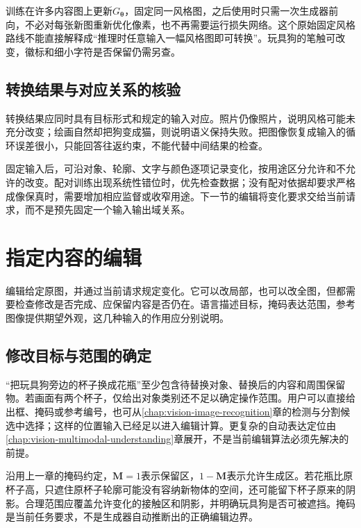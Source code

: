训练在许多内容图上更新$G_{\bm{\theta}}$，固定同一风格图，之后使用时只需一次生成器前向，不必对每张新图重新优化像素，也不再需要运行损失网络。这个原始固定风格路线不能直接解释成“推理时任意输入一幅风格图即可转换”。玩具狗的笔触可改变，徽标和细小字符是否保留仍需另查。

\subsection{转换结果与对应关系的核验}
\label{sec:vision-generation-translation-check}

转换结果应同时具有目标形式和规定的输入对应。照片仍像照片，说明风格可能未充分改变；绘画自然却把狗变成猫，则说明语义保持失败。把图像恢复成输入的循环误差很小，只能回答往返约束，不能代替中间结果的检查。

固定输入后，可沿对象、轮廓、文字与颜色逐项记录变化，按用途区分允许和不允许的改变。配对训练出现系统性错位时，优先检查数据；没有配对依据却要求严格成像保真时，需要增加相应监督或收窄用途。下一节的编辑将变化要求交给当前请求，而不是预先固定一个输入输出域关系。

\section{指定内容的编辑}
\label{sec:vision-generation-editing}

编辑给定原图，并通过当前请求规定变化。它可以改局部，也可以改全图，但都需要检查修改是否完成、应保留内容是否仍在。语言描述目标，掩码表达范围，参考图像提供期望外观，这几种输入的作用应分别说明。

\subsection{修改目标与范围的确定}
\label{sec:vision-generation-editing-scope}

“把玩具狗旁边的杯子换成花瓶”至少包含待替换对象、替换后的内容和周围保留物。若画面有两个杯子，仅给出对象类别还不足以确定操作范围。用户可以直接给出框、掩码或参考编号，也可从\ref{chap:vision-image-recognition}章的检测与分割候选中选择；这样的位置输入已经足以进入编辑计算。更复杂的自动表达定位由\ref{chap:vision-multimodal-understanding}章展开，不是当前编辑算法必须先解决的前提。

沿用上一章的掩码约定，$\bm{M}=1$表示保留区，$1-\bm{M}$表示允许生成区。若花瓶比原杯子高，只遮住原杯子轮廓可能没有容纳新物体的空间，还可能留下杯子原来的阴影。合理范围应覆盖允许变化的接触区和阴影，并明确玩具狗是否可被遮挡。掩码是当前任务要求，不是生成器自动推断出的正确编辑边界。

